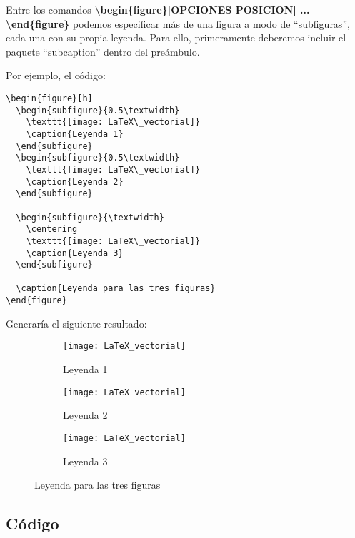 Entre los comandos \textbf{\textbackslash begin\{figure\}[OPCIONES POSICION] ... \textbackslash end\{figure\}} podemos especificar más de una figura a modo de ``subfiguras'', cada una con su propia leyenda. Para ello, primeramente deberemos incluir el paquete ``subcaption'' dentro del preámbulo.

Por ejemplo, el código:

\begin{lstlisting}[language={[LaTeX]Tex}]
\begin{figure}[h]
  \begin{subfigure}{0.5\textwidth}
    \texttt{[image: LaTeX\_vectorial]}
    \caption{Leyenda 1}
  \end{subfigure}
  \begin{subfigure}{0.5\textwidth}
    \texttt{[image: LaTeX\_vectorial]}
    \caption{Leyenda 2}
  \end{subfigure}
	
  \begin{subfigure}{\textwidth}
    \centering
    \texttt{[image: LaTeX\_vectorial]}
    \caption{Leyenda 3}
  \end{subfigure}

  \caption{Leyenda para las tres figuras}
\end{figure}
\end{lstlisting}

Generaría el siguiente resultado:

\begin{figure}[h]
	\begin{subfigure}{0.5\textwidth}
		\texttt{[image: LaTeX\_vectorial]} 
		\caption{Leyenda 1}
	\end{subfigure}
	\begin{subfigure}{0.5\textwidth}
		\texttt{[image: LaTeX\_vectorial]}
		\caption{Leyenda 2}
	\end{subfigure}
	
	\begin{subfigure}{\textwidth}
		\centering
		\texttt{[image: LaTeX\_vectorial]}
		\caption{Leyenda 3}
	\end{subfigure}

	\caption{Leyenda para las tres figuras}
\end{figure}

\subsection{Código}

